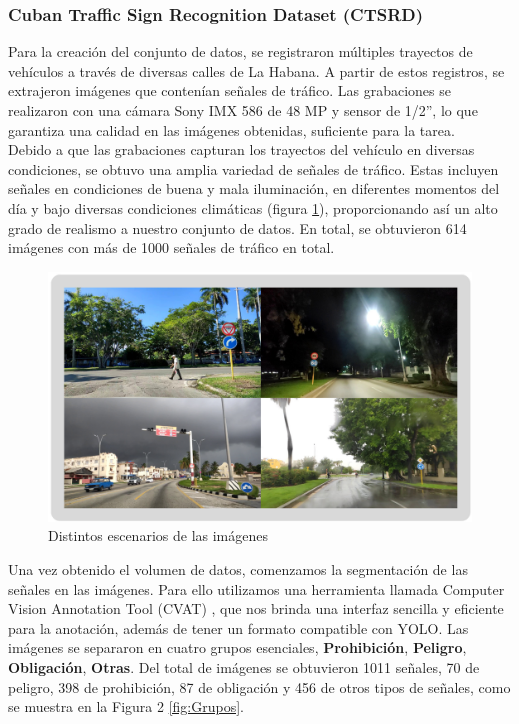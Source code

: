 \documentclass{article}
\begin{document}
\subsubsection{Cuban Traffic Sign Recognition Dataset (CTSRD)}
Para la creación del conjunto de datos, se registraron múltiples trayectos de vehículos a través de diversas calles de La Habana. A partir de estos registros, se extrajeron imágenes que contenían señales de tráfico. Las grabaciones se realizaron con una cámara Sony IMX 586 de 48 MP y sensor de 1/2”, lo que garantiza una calidad en las imágenes obtenidas, suficiente para la tarea.\\
Debido a que las grabaciones capturan los trayectos del vehículo en diversas condiciones, se obtuvo una amplia variedad de señales de tráfico. Estas incluyen señales en condiciones de buena y mala iluminación, en diferentes momentos del día y bajo diversas condiciones climáticas (figura \ref{fig:scenarios}), proporcionando así un alto grado de realismo a nuestro conjunto de datos. En total, se obtuvieron 614 imágenes con más de 1000 señales de tráfico en total.


\begin{figure}[h]
\centering
\includegraphics[width=1.0\textwidth]{resources/stages.png}
\caption{Distintos escenarios de las imágenes}
\label{fig:scenarios}
\end{figure}


Una vez obtenido el volumen de datos, comenzamos la segmentación de las señales en las imágenes. Para ello utilizamos una herramienta llamada Computer Vision Annotation Tool (CVAT) \cite{ref10}, que nos brinda una interfaz sencilla y eficiente para la anotación, además de tener un formato compatible con YOLO. Las imágenes se separaron en cuatro grupos esenciales, \textbf{Prohibición}, \textbf{Peligro}, \textbf{Obligación}, \textbf{Otras}. Del total de imágenes se obtuvieron 1011 señales, 70 de peligro, 398 de prohibición, 87 de obligación y 456 de otros tipos de señales, como se muestra en la Figura 2 \ref{fig:Grupos}.
\end{document}
